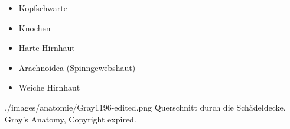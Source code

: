 {
\begin{itemize}
    \item Kopfschwarte
    \item Knochen
    \item Harte Hirnhaut 
    \item Arachnoidea (Spinngewebshaut)
    \item Weiche Hirnhaut 
\end{itemize}
}{}
{./images/anatomie/Gray1196-edited.png}
{Querschnitt durch
die Schädeldecke. }
{Gray's Anatomy, Copyright expired.}


% 
% 
% 
% 
% 
% 
% 
% 
% 
% 
% 
% 
% 
% 
% 

